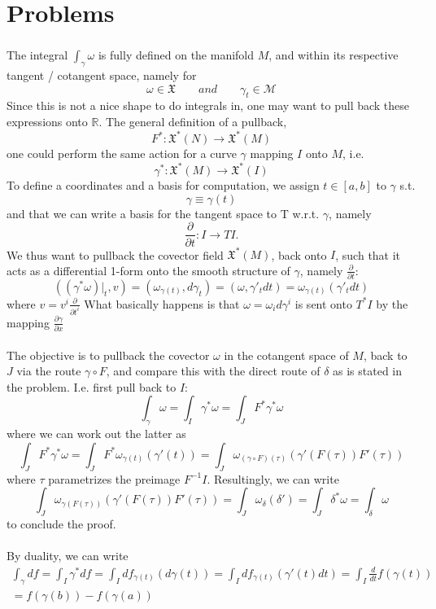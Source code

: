 \part{Problems}
\section{}
\subsection{} 
The integral $\int_{\gamma}\omega$ is fully defined on the manifold $M$, and within its respective tangent / cotangent space, namely for
\[
\omega \in \mathfrak{X} \qquad and \qquad \gamma_t \in \mathcal{M}
\]  
Since this is not a nice shape to do integrals in, one may want to pull back these expressions onto $\mathbb{R}$. 
The general definition of a pullback,
\[ F^* : \mathfrak{X}^*(N) \rightarrow \mathfrak{X}^*(M) \]
one could perform the same action for a curve $\gamma$ mapping $I$ onto $M$, i.e.
\[ \gamma^* : \mathfrak{X}^*(M) \rightarrow \mathfrak{X}^*(I) \]
To define a coordinates and a basis for computation, we assign $t\in[a, b]$ to $\gamma$ s.t.
\[ \gamma \equiv \gamma(t)\]
and that we can write a basis for the tangent space to T w.r.t. $\gamma$, namely
\[ \frac{\partial}{\partial t} : I \rightarrow TI.\]
We thus want to pullback the covector field  $\mathfrak{X}^*(M)$, back onto $I$, such that it acts as a differential 1-form onto the smooth structure of $\gamma$, namely $\frac{\partial }{\partial t}$:
\[ 
	\left((\gamma^*\omega)\bigr\rvert_t,  v \right) = \left(\omega_{\gamma(t)}, d\gamma_t\right) =  \left(\omega, \gamma' _tdt\right) = \omega_{\gamma(t)}\left(\gamma'_tdt\right)
\] 
where $v = v^i\frac{\partial}{\partial t^i}$
What basically happens is that $\omega = \omega_id\gamma^i$ is sent onto $T^*I$ by the mapping $\frac{\partial \gamma}{\partial x}$

\subsection{}
The objective is to pullback the covector $\omega$ in the cotangent space of $M$, back to $J$ via the route $\gamma \circ F $, and compare this with the direct route of $\delta$ as is stated in the problem. I.e. first pull back to $I$:
\[ \int_\gamma \omega = \int_I \gamma^*\omega = \int_J F^* \gamma^*\omega\]
where we can work out the latter as
\[\int_J F^*\gamma^*\omega = \int_J F^* \omega_{\gamma(t)}(\gamma'(t)) = \int_J\omega_{(\gamma\circ F)(\tau)}\left( \gamma'(F(\tau))F'(\tau)  \right) \]
where $\tau$ parametrizes the preimage  $F^{-1}I$.
Resultingly, we can write
\[\int_J\omega_{\gamma(F(\tau))}\left( \gamma'(F(\tau))F'(\tau)  \right) =  \int_J \omega_{\delta}(\delta') = \int_J \delta^*\omega = \int_\delta \omega\]
to conclude the proof.

\subsection{} 
By duality, we can write
\[
\begin{split} \int_\gamma df = \int_I \gamma^*df = \int_I df_{\gamma(t)}(d\gamma (t)) = \int_Idf_{\gamma(t)}(\gamma'(t)dt) = \int_I \frac{d}{dt}f(\gamma(t)) \\  = f(\gamma(b)) - f(\gamma(a))
\end{split}\]
